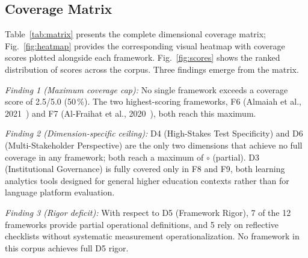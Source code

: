 \documentclass[conference]{IEEEtran}
\newcommand{\partcov}{\textcolor{partcol}{\textbf{$\circ$}}}
\begin{document}
\subsection{Coverage Matrix}

Table~\ref{tab:matrix} presents the complete dimensional coverage
matrix; Fig.~\ref{fig:heatmap} provides the corresponding visual
heatmap with coverage scores plotted alongside each framework.
Fig.~\ref{fig:scores} shows the ranked distribution of scores across
the corpus. Three findings emerge from the matrix.

\textit{Finding 1 (Maximum coverage cap):} No single framework
exceeds a coverage score of 2.5/5.0 (50\,\%). The two
highest-scoring frameworks, F6 (Almaiah et al., 2021~\cite{b5}) and
F7 (Al-Fraihat et al., 2020~\cite{b2}), both reach this maximum.

\textit{Finding 2 (Dimension-specific ceiling):} D4 (High-Stakes Test
Specificity) and D6 (Multi-Stakeholder Perspective) are the only two
dimensions that achieve no full coverage in any framework; both
reach a maximum of \partcov{} (partial). D3 (Institutional
Governance) is fully covered only in F8 and F9, both learning
analytics tools designed for general higher education contexts rather
than for language platform evaluation.

\textit{Finding 3 (Rigor deficit):} With respect to D5 (Framework
Rigor), 7 of the 12 frameworks provide partial operational
definitions, and 5 rely on reflective checklists without systematic
measurement operationalization. No framework in this corpus achieves
full D5 rigor.
\end{document}
